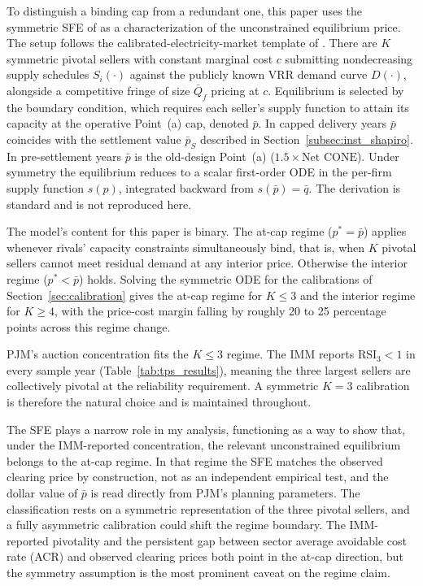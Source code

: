\label{subsec:theory_sfe}%
To distinguish a binding cap from a redundant one, this paper uses the
symmetric SFE of \citet{Klemperer1989_sfe} as a characterization of
the unconstrained equilibrium price. The setup follows the calibrated-electricity-market
template of \citet{Green1992_british}. There are $K$ symmetric pivotal
sellers with constant marginal cost $c$ submitting nondecreasing supply
schedules $S_i(\cdot)$ against the publicly known VRR demand curve
$D(\cdot)$, alongside a competitive fringe of size $\bar Q_f$ pricing
at $c$. Equilibrium is selected by the
\citet{Holmberg2008_unique_sfe} boundary condition, which requires each
seller's supply function to attain its capacity at the operative
Point~(a) cap, denoted $\bar p$. In capped delivery years $\bar p$
coincides with the settlement value $\bar p_S$ described
in Section~\ref{subsec:inst_shapiro}. In pre-settlement years $\bar p$
is the old-design Point~(a) ($1.5 \times \text{Net CONE}$). Under
symmetry the equilibrium reduces to a scalar first-order ODE in the
per-firm supply function $s(p)$, integrated backward from
$s(\bar p) = \bar q$. The derivation is standard
\citep{Klemperer1989_sfe, Green1992_british, Rudkevich1998_poolco} and
is not reproduced here.

The model's content for this paper is binary. The at-cap regime
($p^* = \bar p$) applies whenever rivals' capacity constraints
simultaneously bind, that is, when $K$ pivotal sellers cannot meet
residual demand at any interior price. Otherwise the interior regime
($p^* < \bar p$) holds. Solving the symmetric
ODE for the calibrations of Section~\ref{sec:calibration} gives the
at-cap regime for $K \leq 3$ and the interior regime for $K \geq 4$,
with the price-cost margin falling by roughly 20 to 25 percentage points
across this regime change.

PJM's auction concentration fits the $K \leq 3$ regime. The IMM reports
$\mathrm{RSI}_3 < 1$ in every sample year
(Table~\ref{tab:tps_results}), meaning the three largest sellers are
collectively pivotal at the reliability requirement. A symmetric $K=3$
calibration is therefore the natural choice and is maintained
throughout.

The SFE plays a narrow role in my analysis, functioning as a way to show
that, under the IMM-reported concentration, the relevant unconstrained
equilibrium belongs to the at-cap regime. In that regime the SFE
matches the observed clearing price by construction, not as an
independent empirical test, and the dollar value of $\bar p$ is read
directly from PJM's planning parameters. The classification rests on
a symmetric representation of the three pivotal sellers, and a fully
asymmetric calibration could shift the regime boundary. The IMM-reported pivotality and the persistent gap between sector average avoidable cost rate (ACR)
and observed clearing prices both point in the at-cap direction, but
the symmetry assumption is the most prominent caveat on the regime
claim.
